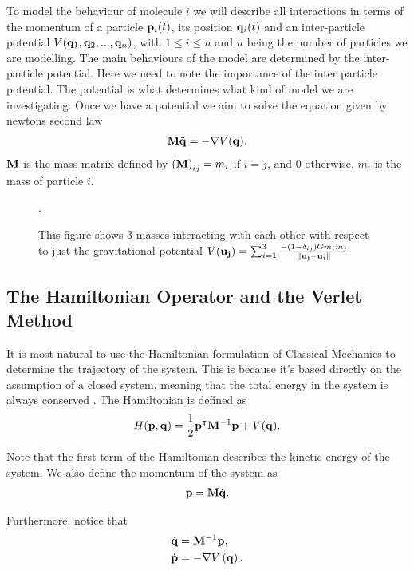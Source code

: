 To model the behaviour of molecule $i$ we will describe all interactions in terms of the momentum of a particle $\mathbf{p}_{i}(t)$, its position $\mathbf{q}_{i}(t)$ and an inter-particle potential $V(\mathbf{q}_1, \mathbf{q}_2,..., \mathbf{q}_n)$, with $1\leq i \leq n$ and $n$ being the number of particles we are modelling. The main behaviours of the model are determined by the inter-particle potential. Here we need to note the importance of the inter particle potential. The potential is what determines what kind of model we are investigating. Once we have  a potential we aim to solve the equation given by newtons second law
\begin{align}
\mathbf{M}\ddot{\mathbf{q}} = -\nabla V(\mathbf{q}).\label{eq:1}
\end{align}
$\mathbf{M}$ is the mass matrix defined by $\left(\mathbf{M}\right)_{ij}=m_i$ if $i=j$, and $0$ otherwise. $m_i$ is the mass of particle $i$.\\


\begin{figure}[h]
\centering
\def\svgscale{0.35}

\caption{This figure shows 3 masses interacting with each other with respect to just the gravitational potential $V(\mathbf{\mathbf{u}_j})=\sum_{i=1}^3\frac{-(1-\delta_{ij}) Gm_im_j}{\norm{\mathbf{\mathbf{u}_j}-\mathbf{u}_i}}$}.
\end{figure}



\subsection{The Hamiltonian Operator and the Verlet Method}\label{sec:V}
It is most natural to use the Hamiltonian formulation of Classical Mechanics to determine the trajectory of the system. This is because it's based directly on the assumption of a closed system, meaning that the total energy in the system is always conserved  \citep{BenLeimkuhler2015}. The Hamiltonian is defined as
\begin{align*}
H(\mathbf{p}, \mathbf{q}) = \frac{1}{2}\mathbf{p}^{\intercal}\mathbf{M}^{-1}\mathbf{p} +V(\mathbf{q}).
\end{align*}

 Note that the first term of the Hamiltonian describes the kinetic energy of the system. We also define the momentum of the system as  
 \begin{align*}
 \mathbf{p} = \mathbf{M}\dot{\mathbf{q}}.
 \end{align*} 
 
 Furthermore, notice that  
 \begin{align*}
 \dot{\mathbf{q}} &= \mathbf{M}^{-1}\mathbf{p}, \\
 \dot{\mathbf{p}} & = -\nabla V\left( \mathbf{q}\right).
 \end{align*}
 
